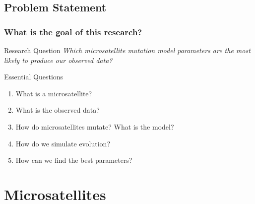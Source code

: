 \documentclass[11pt]{beamer}
\begin{document}
	\subsection{Problem Statement}\label{subsec:ps}
	\begin{frame}
		\frametitle{What is the goal of this research?}
        \begin{block}{Research Question}
            \emph{Which microsatellite mutation model parameters are the most likely to produce our observed data?}
        \end{block} \medskip

        \begin{block}{Essential Questions}
            \begin{enumerate}
                \item What is a microsatellite?
                \item What is the observed data?
                \item How do microsatellites mutate?
                    What is the model?
                \item How do we simulate evolution?
                \item How can we find the best parameters?
            \end{enumerate}
        \end{block}

	\end{frame}

	\section{Microsatellites}\label{sec:mi}
\end{document}
